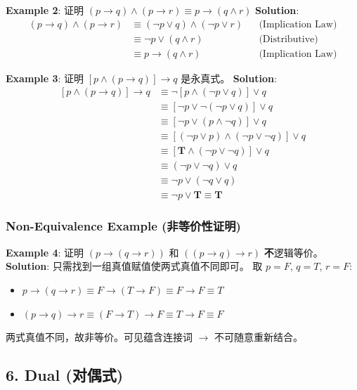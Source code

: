 \documentclass[10pt,a4paper,openany]{ctexbook}
\theoremstyle{definition}
\theoremstyle{remark}
\begin{document}
\textbf{Example 2}: 证明 $(p \to q) \land (p \to r) \equiv p \to (q \land r)$
\textbf{Solution}:
\[
\begin{aligned}
(p \to q) \land (p \to r) &\equiv (\neg p \lor q) \land (\neg p \lor r) &&\text{(Implication Law)} \\
&\equiv \neg p \lor (q \land r) &&\text{(Distributive)} \\
&\equiv p \to (q \land r) &&\text{(Implication Law)}
\end{aligned}
\]

\textbf{Example 3}: 证明 $[p \land (p \to q)] \to q$ 是永真式。
\textbf{Solution}:
\[
\begin{aligned}
[p \land (p \to q)] \to q &\equiv \neg[p \land (\neg p \lor q)] \lor q \\
&\equiv [\neg p \lor \neg(\neg p \lor q)] \lor q \\
&\equiv [\neg p \lor (p \land \neg q)] \lor q \\
&\equiv [(\neg p \lor p) \land (\neg p \lor \neg q)] \lor q \\
&\equiv [\mathbf{T} \land (\neg p \lor \neg q)] \lor q \\
&\equiv (\neg p \lor \neg q) \lor q \\
&\equiv \neg p \lor (\neg q \lor q) \\
&\equiv \neg p \lor \mathbf{T} \equiv \mathbf{T}
\end{aligned}
\]

\subsubsection{Non-Equivalence Example (非等价性证明)}

\textbf{Example 4}: 证明 $(p \to (q \to r))$ 和 $((p \to q) \to r)$ \textbf{不}逻辑等价。
\textbf{Solution}: 只需找到一组真值赋值使两式真值不同即可。
取 $p = F$, $q = T$, $r = F$:
\begin{itemize}
\item $p \to (q \to r) \equiv F \to (T \to F) \equiv F \to F \equiv T$
\item $(p \to q) \to r \equiv (F \to T) \to F \equiv T \to F \equiv F$

\end{itemize}

两式真值不同，故非等价。可见蕴含连接词 $\to$ 不可随意重新结合。
\vspace{-2pt}

\subsection{6. Dual (对偶式)}
\end{document}
